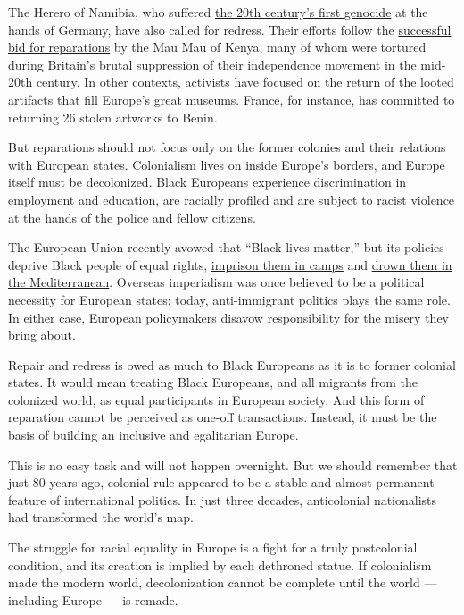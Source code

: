 The Herero of Namibia, who suffered
\href{https://www.ushmm.org/collections/bibliography/herero-and-nama-genocide}{the
20th century's first genocide} at the hands of Germany, have also called
for redress. Their efforts follow the
\href{https://www.bbc.co.uk/news/uk-22790037}{successful bid for
reparations} by the Mau Mau of Kenya, many of whom were tortured during
Britain's brutal suppression of their independence movement in the
mid-20th century. In other contexts, activists have focused on the
return of the looted artifacts that fill Europe's great museums. France,
for instance, has committed to returning 26 stolen artworks to Benin.

But reparations should not focus only on the former colonies and their
relations with European states. Colonialism lives on inside Europe's
borders, and Europe itself must be decolonized. Black Europeans
experience discrimination in employment and education, are racially
profiled and are subject to racist violence at the hands of the police
and fellow citizens.

The European Union recently avowed that ``Black lives matter,'' but its
policies deprive Black people of equal rights,
\href{https://www.nytimes.com/2018/10/03/opinion/greece-europe-refugees.html}{imprison
them in camps} and
\href{https://www.nytimes.com/interactive/2018/12/26/opinion/europe-migrant-crisis-mediterranean-libya.html}{drown
them in the Mediterranean}. Overseas imperialism was once believed to be
a political necessity for European states; today, anti-immigrant
politics plays the same role. In either case, European policymakers
disavow responsibility for the misery they bring about.

Repair and redress is owed as much to Black Europeans as it is to former
colonial states. It would mean treating Black Europeans, and all
migrants from the colonized world, as equal participants in European
society. And this form of reparation cannot be perceived as one-off
transactions. Instead, it must be the basis of building an inclusive and
egalitarian Europe.

This is no easy task and will not happen overnight. But we should
remember that just 80 years ago, colonial rule appeared to be a stable
and almost permanent feature of international politics. In just three
decades, anticolonial nationalists had transformed the world's map.

The struggle for racial equality in Europe is a fight for a truly
postcolonial condition, and its creation is implied by each dethroned
statue. If colonialism made the modern world, decolonization cannot be
complete until the world --- including Europe --- is remade.

